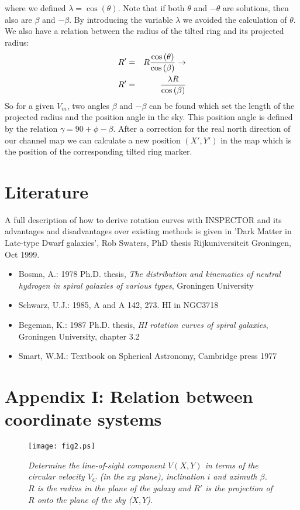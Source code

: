 \documentclass[11pt,a4paper]{article}
\newcommand{\cosb}[1]{\cos \left( #1 \right)}
\begin{document}
where we defined $\lambda = \cosb{\theta}$. Note that if both $\theta$ and $-\theta$ 
are solutions, then also are $\beta$ and $-\beta$. By introducing the variable $\lambda$
we avoided the calculation of $\theta$. 
We also have a relation between the radius of the tilted ring and its projected radius:
\begin{eqnarray}
R' &=& R {{\cosb{\theta}}\over{\cosb{\beta}}} \rightarrow \nonumber \\
R' &=& {\lambda R} \over {\cosb{\beta}}
\end{eqnarray}
So for a given $V_m$, two angles $\beta$ and $-\beta$ can be found which 
set the length of the projected radius and the position angle in the sky.
This position angle is defined by the relation $\gamma = 90 + \phi - \beta$.
After a correction for the real north direction of our channel map we can 
calculate a new position $(X',Y')$ in the map which is the position of the 
corresponding tilted ring marker.

\section{Literature}

A full description of how to derive rotation curves with
INSPECTOR and its advantages and disadvantages over
existing methods is given in 'Dark Matter in
Late-type Dwarf galaxies', Rob Swaters, PhD thesis
Rijkuniversiteit Groningen, Oct 1999.

\begin{itemize}
\item Bosma, A.: 1978 Ph.D. thesis, {\it The distribution and kinematics of neutral hydrogen in spiral galaxies of various types}, Groningen University
\item Schwarz, U.J.: 1985, A and A 142, 273. HI in NGC3718
\item Begeman, K.: 1987 Ph.D. thesis, {\it HI rotation curves of spiral galaxies}, Groningen University, chapter 3.2
\item Smart, W.M.: Textbook on Spherical Astronomy, Cambridge press 1977
\end{itemize}
\pagebreak

\section*{Appendix I: Relation between coordinate systems}
\begin{figure}
   \centering
   \texttt{[image: fig2.ps]}
   \caption{\it Determine the line-of-sight component $V(X,Y)$ in terms of the 
     circular velocity $V_C$ (in the $xy$ plane), inclination $i$ 
     and azimuth $\beta$. $R$ is the radius in the plane of the galaxy and $R'$
     is the projection of $R$ onto the plane of the sky ($X,Y$).}
   \label{fig:fig2ap}
\end{figure}
\end{document}
